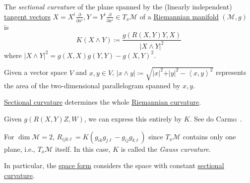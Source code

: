 \begin{definition}\label{def:sectional-curvature}
	The \emph{sectional curvature} of the plane spanned by the (linearly independent) \hyperref[def:tangent-vector]{tangent vectors} \(X = X^i \frac{\partial }{\partial x^i} , Y= Y^i \frac{\partial }{\partial x^i} \in T_x \mathcal{M} \) of a \hyperref[def:Riemannian-manifold]{Riemannian manifold} \((\mathcal{M}, g)\) is
	\[
		K(X \wedge Y) \coloneqq \frac{g(R(X, Y) Y, X)}{\vert X\wedge Y \vert^2 }
	\]
	where \(\vert X \wedge Y \vert ^2 = g(X, X) g(Y, Y) - g(X, Y)^2\).
\end{definition}

\begin{intuition}
	Given a vector space \(V\) and \(x, y\in V\), \(\vert x \wedge y \vert \coloneqq \sqrt{\vert x \vert ^2 + \vert y \vert ^{2} - \left\langle x, y \right\rangle ^2} \) represents the area of the two-dimensional parallelogram spanned by \(x, y\).
\end{intuition}

\begin{remark}
	\hyperref[def:sectional-curvature]{Sectional curvature} determines the whole \hyperref[def:Riemannian-curvature]{Riemannian curvature}.
\end{remark}
\begin{explanation}
	Given \(g(R(X, Y)Z, W)\), we can express this entirely by \(K\). See do Carmo~\cite[Lemma 3.3]{flaherty2013riemannian}.
\end{explanation}

\begin{remark}
	For \(\dim \mathcal{M} = 2\), \(R_{ijk\ell} = K(g_{ik} g_{j \ell } - g_{ij} g_{k \ell })\) since \(T_x \mathcal{M} \) contains only one plane, i.e., \(T_x \mathcal{M} \) itself. In this case, \(K\) is called the \emph{Gauss curvature}.
\end{remark}

In particular, the \hyperref[def:space-form]{space form} considers the space with constant \hyperref[def:sectional-curvature]{sectional curvature}.

